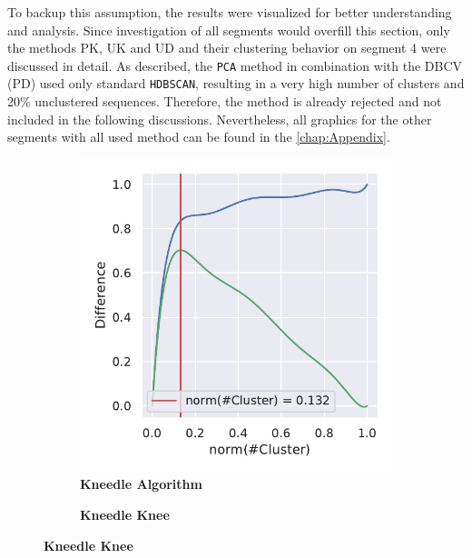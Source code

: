 To backup this assumption, the results were visualized for better understanding and analysis. Since investigation of all segments would overfill this section, only the methods PK, UK and UD and their clustering behavior on segment 4 were discussed in detail. As described, the \texttt{PCA} method in combination with the \gls{DBCV} (PD) used only standard \texttt{HDBSCAN}, resulting in a very high number of clusters and 20\% unclustered sequences. Therefore, the method is already rejected and not included in the following discussions. Nevertheless, all graphics for the other segments with all used method can be found in the \autoref{chap:Appendix}. 

\begin{figure}[!hbt]
    \centering
    \begin{subfigure}[b]{0.475\textwidth}
        \caption[Kneedle Algorithm]{\textbf{Kneedle Algorithm}}
        \label{subfig:PCA_Cluster_Knee_Kneedle_4}            \includegraphics[width=\textwidth]{PCA/Cluster_Knee_Segment_4.pdf}
    \end{subfigure}
    \hfill
    \begin{subfigure}[b]{0.475\textwidth}
        \caption[Kneedle Knee]{\textbf{Kneedle Knee}}

\end{subfigure}
\end{figure}

